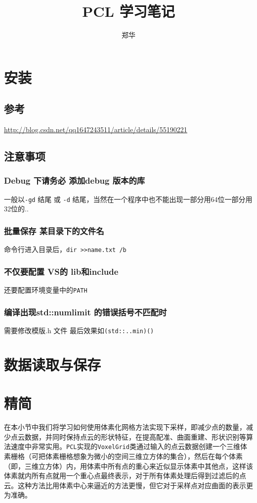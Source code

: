 \documentclass[UTF8,a4paper,12pt]{ctexbook}
\author{\kaishu 郑华}
\title{\heiti PCL 学习笔记}
\begin{document}
 	\maketitle
	\tableofcontents
	
\chapter{安装}
	\section{参考} \url{http://blog.csdn.net/qq1647243511/article/details/55190221}
	
	\section{注意事项}
		\subsection{Debug 下请务必 添加debug 版本的库} 一般以\verb|-gd| 结尾 或 \verb|-d| 结尾，当然在一个程序中也不能出现一部分用64位一部分用32位的..
		\subsection{批量保存 某目录下的文件名} 命令行进入目录后，\verb|dir >>name.txt /b|
		\subsection{不仅要配置 VS的 lib和include} 还要配置环境变量中的\verb|PATH|
		\subsection{编译出现std::numlimit 的错误括号不匹配时} 需要修改模版.h 文件 最后效果如\verb|(std::..min)()|
\chapter{数据读取与保存}

\chapter{精简}
	在本小节中我们将学习如何使用体素化网格方法实现下采样，即减少点的数量，减少点云数据，并同时保持点云的形状特征，在提高配准、曲面重建、形状识别等算法速度中非常实用。\verb|PCL|实现的\verb|VoxelGrid|类通过输入的点云数据创建一个三维体素栅格（可把体素栅格想象为微小的空间三维立方体的集合），然后在每个体素（即，三维立方体）内，用体素中所有点的重心来近似显示体素中其他点，这样该体素就内所有点就用一个重心点最终表示，对于所有体素处理后得到过滤后的点云。这种方法比用体素中心来逼近的方法更慢，但它对于采样点对应曲面的表示更为准确。
	
\end{document}

